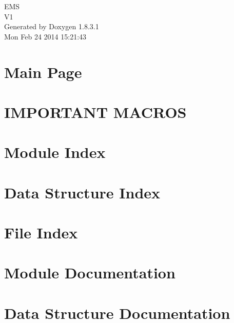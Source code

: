 \documentclass{book}
\begin{document}
\hypersetup{pageanchor=false,citecolor=blue}
\begin{titlepage}
\vspace*{7cm}
\begin{center}
{\Large E\-M\-S \\[1ex]\large V1 }\\
\vspace*{1cm}
{\large Generated by Doxygen 1.8.3.1}\\
\vspace*{0.5cm}
{\small Mon Feb 24 2014 15:21:43}\\
\end{center}
\end{titlepage}
\clearemptydoublepage
{}
\tableofcontents
\clearemptydoublepage
{}
\hypersetup{pageanchor=true,citecolor=blue}
\chapter{Main Page}
\label{index}\hypertarget{index}{}
\chapter{I\-M\-P\-O\-R\-T\-A\-N\-T M\-A\-C\-R\-O\-S}
\label{p1}
\hypertarget{p1}{}

\chapter{Module Index}

\chapter{Data Structure Index}

\chapter{File Index}

\chapter{Module Documentation}




\chapter{Data Structure Documentation}

























\end{document}
